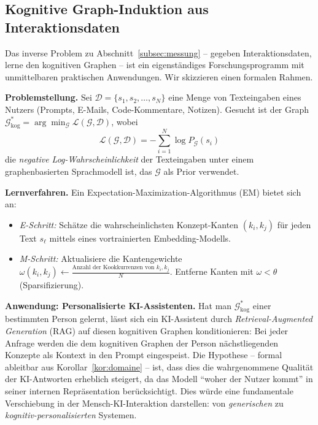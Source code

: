 ﻿\documentclass[12pt,a4paper]{article}
\theoremstyle{plain}
\theoremstyle{definition}
\theoremstyle{remark}
\newcommand{\GG}{\mathcal{G}}
\begin{document}
\subsection{Kognitive Graph-Induktion aus Interaktionsdaten}
\label{subsec:induktion}

Das inverse Problem zu Abschnitt~\ref{subsec:messung} -- gegeben Interaktionsdaten, lerne den kognitiven Graphen -- ist ein eigenständiges Forschungsprogramm mit unmittelbaren praktischen Anwendungen. Wir skizzieren einen formalen Rahmen.

\textbf{Problemstellung.} Sei $\mathcal{D} = \{s_1, s_2, \ldots, s_N\}$ eine Menge von Texteingaben eines Nutzers (Prompts, E-Mails, Code-Kommentare, Notizen). Gesucht ist der Graph $\GG_{\text{kog}}^* = \arg\min_\GG \mathcal{L}(\GG, \mathcal{D})$, wobei
\[
  \mathcal{L}(\GG, \mathcal{D}) = -\sum_{i=1}^N \log P_{\GG}(s_i)
\]
die \emph{negative Log-Wahrscheinlichkeit} der Texteingaben unter einem graphenbasierten Sprachmodell ist, das $\GG$ als Prior verwendet.

\textbf{Lernverfahren.} Ein Expectation-Maximization-Algorithmus (EM) bietet sich an:
\begin{itemize}
  \item \textit{E-Schritt:} Schätze die wahrscheinlichsten Konzept-Kanten $(k_i, k_j)$ für jeden Text $s_\ell$ mittels eines vortrainierten Embedding-Modells.
  \item \textit{M-Schritt:} Aktualisiere die Kantengewichte $\omega(k_i, k_j) \leftarrow \frac{\text{Anzahl der Kookkurrenzen von } k_i, k_j}{N}$. Entferne Kanten mit $\omega < \theta$ (Sparsifizierung).
\end{itemize}

\textbf{Anwendung: Personalisierte KI-Assistenten.} Hat man $\GG_{\text{kog}}^*$ einer bestimmten Person gelernt, lässt sich ein KI-Assistent durch \emph{Retrieval-Augmented Generation} (RAG) auf diesen kognitiven Graphen konditionieren: Bei jeder Anfrage werden die dem kognitiven Graphen der Person nächstliegenden Konzepte als Kontext in den Prompt eingespeist. Die Hypothese -- formal ableitbar aus Korollar~\ref{kor:domaine} -- ist, dass dies die wahrgenommene Qualität der KI-Antworten erheblich steigert, da das Modell ``woher der Nutzer kommt'' in seiner internen Repräsentation berücksichtigt. Dies würde eine fundamentale Verschiebung in der Mensch-KI-Interaktion darstellen: von \emph{generischen} zu \emph{kognitiv-personalisierten} Systemen.
\end{document}
